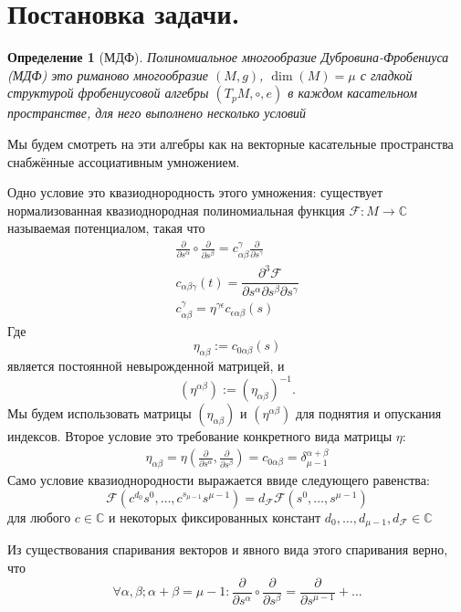 \documentclass[a4paper, 10pt]{article}
\theoremstyle{plain}
\newtheorem{defin}{Определение}
\newcommand{\defeq}{:=}
\newcommand{\tang}[1][\hspace{0pt}]{\frac{\partial }{\partial #1}}
\begin{document}
\section{Постановка задачи.}
\begin{defin}[МДФ]
    Полиномиальное многообразие Дубровина-Фробениуса (МДФ) это риманово многообразие \((M, g)\), \(\operatorname{dim}(M) = \mu\) с гладкой структурой фробениусовой алгебры \((T_pM, \circ, e)\) в каждом касательном пространстве, для него выполнено несколько условий
\end{defin}
Мы будем смотреть на эти алгебры как на векторные касательные пространства снабжённые ассоциативным умножением.\par
Одно условие это квазиоднородность этого умножения: существует нормализованная квазиоднородная полиномиальная функция \(\mathcal{F}: M \to \mathbb{C}\) называемая потенциалом, такая что  \begin{equation}
    \begin{gathered}
        \tang[s^\alpha] \circ \tang[s^\beta] = c^\gamma_{\alpha\beta}\tang[s^{\gamma}]\\
        c_{\alpha\beta\gamma}(t) = \dfrac{\partial^3 \mathcal{F}}{\partial s^{\alpha}\partial s^{\beta}\partial s^{\gamma}}\\
        c^\gamma_{\alpha\beta} = \eta^{\gamma\epsilon}c_{\epsilon\alpha\beta}(s)
    \end{gathered}
\end{equation}
Где
\[
\eta_{\alpha\beta} \defeq c_{0\alpha\beta}(s)
\]
является постоянной невырожденной матрицей, и
\[
(\eta^{\alpha\beta}) \defeq (\eta_{\alpha\beta})^{-1}.
\]
Мы будем использовать матрицы \((\eta_{\alpha\beta})\) и \((\eta^{\alpha\beta})\) для поднятия и опускания индексов. Второе условие это требование конкретного вида матрицы \(\eta\):
\begin{gather} \eta_{\alpha\beta} = \eta(\tang[s^\alpha], \tang[s^\beta]) = c_{0\alpha\beta} = \delta^{\alpha + \beta}_{\mu-1}
\end{gather}
Само условие квазиоднородности выражается ввиде следующего равенства:
\[\mathcal{F}(c^{d_0}s^0, \dots, c^{s_{\mu-1}}s^{\mu-1}) = d_\mathcal{F}\mathcal{F}(s^0,\dots, s^{\mu-1})\]
для любого \(c \in \mathbb{C}\) и некоторых фиксированных констант \(d_0, \dots, d_{\mu-1}, d_\mathcal{F} \in \mathbb{C}\)\par
Из существования спаривания векторов и явного вида этого спаривания верно, что \[\forall \alpha, \beta; \alpha + \beta = \mu - 1:\tang[s^\alpha]\circ \tang[s^\beta] = \tang[s^{\mu-1}] + \dots\]
\end{document}
